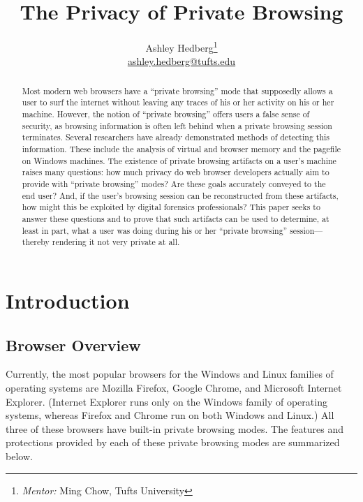 \documentclass[pdftex,letterpaper,12pt]{article}
\begin{document}
  \singlespacing
  \title{The Privacy of Private Browsing}
  \author{Ashley Hedberg\thanks{\emph{Mentor:} Ming Chow, Tufts University} \\
  \href{mailto:ashley.hedberg@tufts.edu}{ashley.hedberg@tufts.edu}}
  \date{}
  \maketitle
  
  \begin{abstract}
  Most modern web browsers have a ``private browsing'' mode that supposedly 
  allows a user to surf the internet without leaving any traces of his or her
  activity on his or her machine. However, the notion of ``private browsing'' 
  offers users a false sense of security, as browsing information is often left
  behind when a private browsing session terminates. Several researchers have 
  already demonstrated methods of detecting this information. These include the
  analysis of virtual and browser memory and the pagefile on Windows machines.
  The existence of private browsing artifacts on a user’s machine raises many 
  questions: how much privacy do web browser developers actually aim to provide
  with ``private browsing'' modes? Are these goals accurately conveyed to the 
  end user? And, if the user’s browsing session can be reconstructed from these
  artifacts, how might this be exploited by digital forensics professionals? 
  This paper seeks to answer these questions and to prove that such artifacts 
  can be used to determine, at least in part, what a user was doing during his 
  or her ``private browsing'' session---thereby rendering it not very private 
  at all.
  \end{abstract}

  \doublespacing
  \section{Introduction}
    \subsection{Browser Overview}
    Currently, the most popular browsers for the Windows and Linux families of
    operating systems are Mozilla Firefox, Google Chrome, and Microsoft 
    Internet Explorer. (Internet Explorer runs only on the Windows family of
    operating systems, whereas Firefox and Chrome run on both Windows and 
    Linux.) All three of these browsers have built-in private browsing modes.
    The features and protections provided by each of these private browsing
    modes are summarized below.\cite{verdi13}\cite{google13}\cite{ie13}
\end{document}
